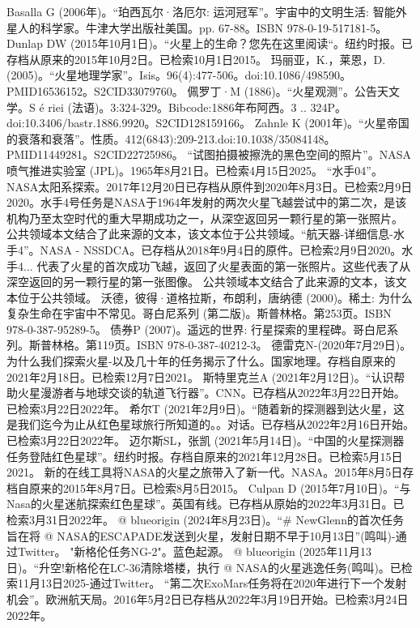 \begin{enumerate}
 Basalla G (2006年)。“珀西瓦尔·洛厄尔: 运河冠军”。宇宙中的文明生活: 智能外星人的科学家。牛津大学出版社美国。pp. 67-88。ISBN 978-0-19-517181-5。
 Dunlap DW (2015年10月1日)。“火星上的生命？您先在这里阅读“。纽约时报。已存档从原来的2015年10月2日。已检索10月1日2015。
 玛丽亚，K.，莱恩，D.(2005)。“火星地理学家”。Isis。96(4):477-506。doi:10.1086/498590。PMID16536152。S2CID33079760。  
 佩罗丁·M (1886)。“火星观测”。公告天文学。S é riei (法语)。3:324-329。Bibcode:1886年布阿西。3 .. 324P。doi:10.3406/bastr.1886.9920。S2CID128159166。 
 Zahnle K (2001年)。“火星帝国的衰落和衰落”。性质。412(6843):209-213.doi:10.1038/35084148。PMID11449281。S2CID22725986。  
 “试图拍摄被擦洗的黑色空间的照片”。NASA喷气推进实验室 (JPL)。1965年8月21日。已检索4月15日2025。
 “水手04”。NASA太阳系探索。2017年12月20日已存档从原件到2020年8月3日。已检索2月9日2020。水手4号任务是NASA于1964年发射的两次火星飞越尝试中的第二次，是该机构乃至太空时代的重大早期成功之一，从深空返回另一颗行星的第一张照片。 公共领域本文结合了此来源的文本，该文本位于公共领域。“航天器-详细信息-水手4”。NASA - NSSDCA。已存档从2018年9月4日的原件。已检索2月9日2020。水手4... 代表了火星的首次成功飞越，返回了火星表面的第一张照片。这些代表了从深空返回的另一颗行星的第一张图像。 公共领域本文结合了此来源的文本，该文本位于公共领域。
 沃德，彼得·道格拉斯，布朗利，唐纳德 (2000)。稀土: 为什么复杂生命在宇宙中不常见。哥白尼系列 (第二版)。斯普林格。第253页。ISBN 978-0-387-95289-5。
 债券P (2007)。遥远的世界: 行星探索的里程碑。哥白尼系列。斯普林格。第119页。ISBN 978-0-387-40212-3。
 德雷克N-(2020年7月29日)。为什么我们探索火星-以及几十年的任务揭示了什么。国家地理。存档自原来的2021年2月18日。已检索12月7日2021。
 斯特里克兰A (2021年2月12日)。“认识帮助火星漫游者与地球交谈的轨道飞行器”。CNN。已存档从2022年3月22日开始。已检索3月22日2022年。
 希尔T (2021年2月9日)。“随着新的探测器到达火星，这是我们迄今为止从红色星球旅行所知道的。。对话。已存档从2022年2月16日开始。已检索3月22日2022年。
 迈尔斯SL，张凯 (2021年5月14日)。“中国的火星探测器任务登陆红色星球”。纽约时报。存档自原来的2021年12月28日。已检索5月15日2021。
 新的在线工具将NASA的火星之旅带入了新一代。NASA。2015年8月5日存档自原来的2015年8月7日。已检索8月5日2015。
 Culpan D (2015年7月10日)。“与Nasa的火星迷航探索红色星球”。英国有线。已存档从原始的2022年3月31日。已检索3月31日2022年。
 @ blueorigin (2024年8月23日)。“# NewGlenn的首次任务旨在将 @ NASA的ESCAPADE发送到火星，发射日期不早于10月13日”(鸣叫)-通过Twitter。
 "新格伦任务NG-2"。蓝色起源。
 @ blueorigin (2025年11月13日)。“升空!新格伦在LC-36清除塔楼，执行 @ NASA的火星逃逸任务(鸣叫)。已检索11月13日2025-通过Twitter。
 “第二次ExoMars任务将在2020年进行下一个发射机会”。欧洲航天局。2016年5月2日已存档从2022年3月19日开始。已检索3月24日2022年。

\end{enumerate}

